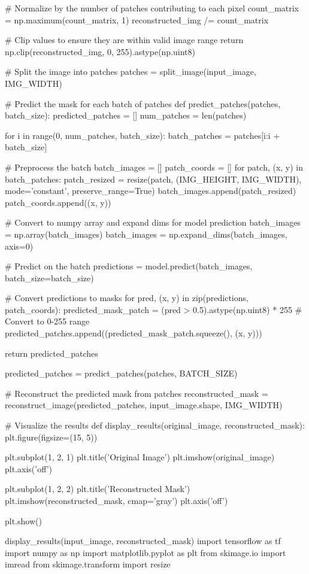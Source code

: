 \documentclass[conference]{IEEEtran}
\begin{document}
# Normalize by the number of patches contributing to each pixel
count_matrix = np.maximum(count_matrix, 1)
reconstructed_img /= count_matrix

# Clip values to ensure they are within valid image range
return np.clip(reconstructed_img, 0, 255).astype(np.uint8)

# Split the image into patches
patches = split_image(input_image, IMG_WIDTH)

# Predict the mask for each batch of patches
def predict_patches(patches, batch_size):
predicted_patches = []
num_patches = len(patches)

for i in range(0, num_patches, batch_size):
batch_patches = patches[i:i + batch_size]

# Preprocess the batch
batch_images = []
patch_coords = []
for patch, (x, y) in batch_patches:
patch_resized = resize(patch, (IMG_HEIGHT, IMG_WIDTH), mode='constant', preserve_range=True)
batch_images.append(patch_resized)
patch_coords.append((x, y))

# Convert to numpy array and expand dims for model prediction
batch_images = np.array(batch_images)
batch_images = np.expand_dims(batch_images, axis=0)

# Predict on the batch
predictions = model.predict(batch_images, batch_size=batch_size)

# Convert predictions to masks
for pred, (x, y) in zip(predictions, patch_coords):
predicted_mask_patch = (pred > 0.5).astype(np.uint8) * 255  # Convert to 0-255 range
predicted_patches.append((predicted_mask_patch.squeeze(), (x, y)))

return predicted_patches

predicted_patches = predict_patches(patches, BATCH_SIZE)

# Reconstruct the predicted mask from patches
reconstructed_mask = reconstruct_image(predicted_patches, input_image.shape, IMG_WIDTH)

# Visualize the results
def display_results(original_image, reconstructed_mask):
plt.figure(figsize=(15, 5))

plt.subplot(1, 2, 1)
plt.title('Original Image')
plt.imshow(original_image)
plt.axis('off')

plt.subplot(1, 2, 2)
plt.title('Reconstructed Mask')
plt.imshow(reconstructed_mask, cmap='gray')
plt.axis('off')

plt.show()

display_results(input_image, reconstructed_mask)
import tensorflow as tf
import numpy as np
import matplotlib.pyplot as plt
from skimage.io import imread
from skimage.transform import resize
\end{document}
